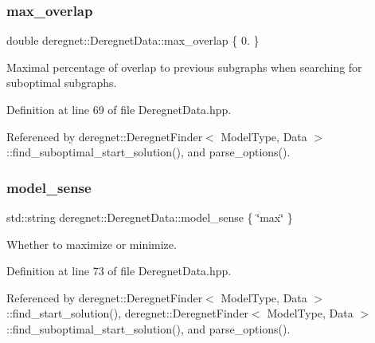 \mbox{\label{classderegnet_1_1DeregnetData_a43111d8664fd9db36f36f75b24ba62e9}} 
\subsubsection{\texorpdfstring{max\+\_\+overlap}{max\_overlap}}
{\footnotesize\ttfamily double deregnet\+::\+Deregnet\+Data\+::max\+\_\+overlap \{ 0. \}}



Maximal percentage of overlap to previous subgraphs when searching for suboptimal subgraphs. 



Definition at line 69 of file Deregnet\+Data.\+hpp.



Referenced by deregnet\+::\+Deregnet\+Finder$<$ Model\+Type, Data $>$\+::find\+\_\+suboptimal\+\_\+start\+\_\+solution(), and parse\+\_\+options().

\mbox{\label{classderegnet_1_1DeregnetData_ac3918536b5423facf0ac155997703c52}} 
\subsubsection{\texorpdfstring{model\+\_\+sense}{model\_sense}}
{\footnotesize\ttfamily std\+::string deregnet\+::\+Deregnet\+Data\+::model\+\_\+sense \{ \char`\"{}max\char`\"{} \}}



Whether to maximize or minimize. 



Definition at line 73 of file Deregnet\+Data.\+hpp.



Referenced by deregnet\+::\+Deregnet\+Finder$<$ Model\+Type, Data $>$\+::find\+\_\+start\+\_\+solution(), deregnet\+::\+Deregnet\+Finder$<$ Model\+Type, Data $>$\+::find\+\_\+suboptimal\+\_\+start\+\_\+solution(), and parse\+\_\+options().

\mbox{\label{classderegnet_1_1DeregnetData_a3b57d7ed19c104c7fe257e17f0d2cfb5}} 
